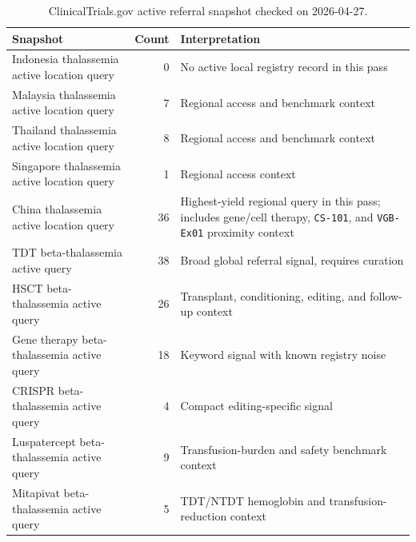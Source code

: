 \begin{table}[htbp]
\centering
\small
\caption{ClinicalTrials.gov active referral snapshot checked on 2026-04-27.}
\label{tab:referral-snapshot}
\begin{tabularx}{\textwidth}{@{}L{0.34\textwidth}rY@{}}
\toprule
Snapshot & Count & Interpretation \\
\midrule
Indonesia thalassemia active location query & 0 & No active local registry
record in this pass \\
Malaysia thalassemia active location query & 7 & Regional access and benchmark
context \\
Thailand thalassemia active location query & 8 & Regional access and benchmark
context \\
Singapore thalassemia active location query & 1 & Regional access context \\
China thalassemia active location query & 36 & Highest-yield regional query in
this pass; includes gene/cell therapy, \texttt{CS-101}, and \texttt{VGB-Ex01}
proximity context \\
TDT beta-thalassemia active query & 38 & Broad global referral signal, requires
curation \\
HSCT beta-thalassemia active query & 26 & Transplant, conditioning, editing,
and follow-up context \\
Gene therapy beta-thalassemia active query & 18 & Keyword signal with known
registry noise \\
CRISPR beta-thalassemia active query & 4 & Compact editing-specific signal \\
Luspatercept beta-thalassemia active query & 9 & Transfusion-burden and safety
benchmark context \\
Mitapivat beta-thalassemia active query & 5 & TDT/NTDT hemoglobin and
transfusion-reduction context \\
\bottomrule
\end{tabularx}
\end{table}

